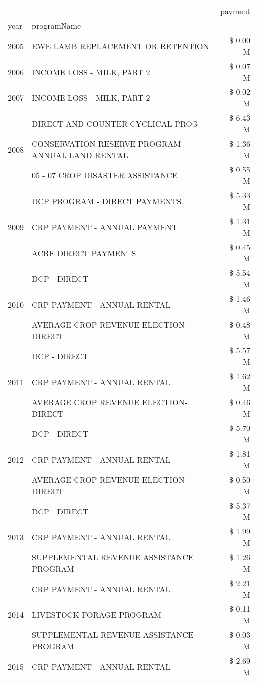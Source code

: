 \begin{tabular}{llr}
\toprule
 &  & payment \\
year & programName &  \\
\midrule
2005 & EWE LAMB REPLACEMENT OR RETENTION & \$ 0.00 M \\
\cline{1-3}
2006 & INCOME LOSS - MILK, PART 2 & \$ 0.07 M \\
\cline{1-3}
2007 & INCOME LOSS - MILK, PART 2 & \$ 0.02 M \\
\cline{1-3}
\multirow[t]{3}{*}{2008} & DIRECT AND COUNTER CYCLICAL PROG & \$ 6.43 M \\
 & CONSERVATION RESERVE PROGRAM - ANNUAL LAND RENTAL & \$ 1.36 M \\
 & 05 - 07 CROP DISASTER ASSISTANCE & \$ 0.55 M \\
\cline{1-3}
\multirow[t]{3}{*}{2009} & DCP PROGRAM - DIRECT PAYMENTS & \$ 5.33 M \\
 & CRP PAYMENT - ANNUAL PAYMENT & \$ 1.31 M \\
 & ACRE DIRECT PAYMENTS & \$ 0.45 M \\
\cline{1-3}
\multirow[t]{3}{*}{2010} & DCP - DIRECT & \$ 5.54 M \\
 & CRP PAYMENT - ANNUAL RENTAL & \$ 1.46 M \\
 & AVERAGE CROP REVENUE ELECTION-DIRECT & \$ 0.48 M \\
\cline{1-3}
\multirow[t]{3}{*}{2011} & DCP - DIRECT & \$ 5.57 M \\
 & CRP PAYMENT - ANNUAL RENTAL & \$ 1.62 M \\
 & AVERAGE CROP REVENUE ELECTION-DIRECT & \$ 0.46 M \\
\cline{1-3}
\multirow[t]{3}{*}{2012} & DCP - DIRECT & \$ 5.70 M \\
 & CRP PAYMENT - ANNUAL RENTAL & \$ 1.81 M \\
 & AVERAGE CROP REVENUE ELECTION-DIRECT & \$ 0.50 M \\
\cline{1-3}
\multirow[t]{3}{*}{2013} & DCP - DIRECT & \$ 5.37 M \\
 & CRP PAYMENT - ANNUAL RENTAL & \$ 1.99 M \\
 & SUPPLEMENTAL REVENUE ASSISTANCE PROGRAM & \$ 1.26 M \\
\cline{1-3}
\multirow[t]{3}{*}{2014} & CRP PAYMENT - ANNUAL RENTAL & \$ 2.21 M \\
 & LIVESTOCK FORAGE PROGRAM & \$ 0.11 M \\
 & SUPPLEMENTAL REVENUE ASSISTANCE PROGRAM & \$ 0.03 M \\
\cline{1-3}
\multirow[t]{3}{*}{2015} & CRP PAYMENT - ANNUAL RENTAL & \$ 2.69 M \\

\end{tabular}
